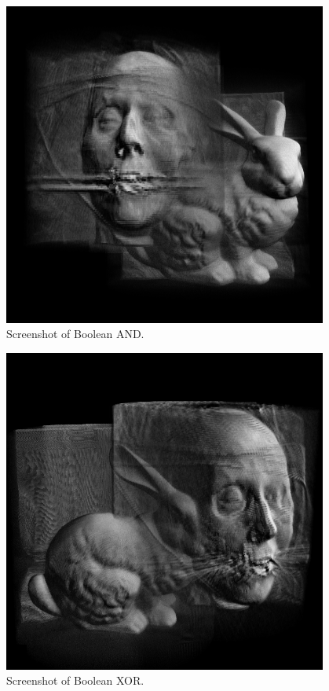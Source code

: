 \documentclass{report}
\begin{document}
\begin{figure}
\centering
\includegraphics[width=0.95\textwidth]{boolean-and-screenshot.png}
\caption{Screenshot of Boolean AND.}
\end{figure}

\begin{figure}
\centering
\includegraphics[width=0.95\textwidth]{boolean-xor-screenshot.png}
\caption{Screenshot of Boolean XOR.}
\end{figure}
\end{document}
